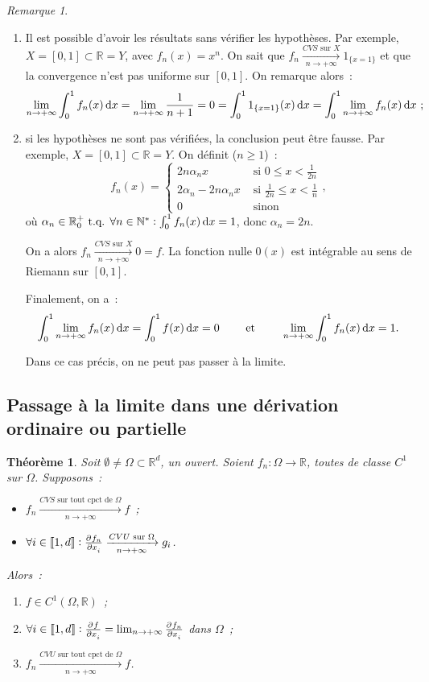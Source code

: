 \documentclass{report}
\newtheorem{thm}{Théorème}[chapter]
\theoremstyle{definition}
\theoremstyle{remark}
\newtheorem*{rmq}{Remarque}
\newcommand{\R}{\mathbb R}
\newcommand{\N}{\mathbb N}
\newcommand{\tq}{\text{ t.q. }}
\newcommand{\CONV}[5]{\xrightarrow[#2 \to #3]{#4 \text{ #5 } #1}}
\newcommand{\CVS}[3]{\CONV{#1}{#2}{#3}{CVS}{sur}}
\newcommand{\CVSc}[3]{\CONV{#1}{#2}{#3}{CVS}{sur tout cpct de}}
\newcommand{\CVU}[3]{\CONV{#1}{#2}{#3}{CVU}{sur}}
\newcommand{\CVUc}[3]{\CONV{#1}{#2}{#3}{CVU}{sur tout cpct de}}
\newcommand{\intint}[2]{\left\llbracket#1, #2\right\rrbracket}
\newcommand{\pinfty}{{+\infty}}
\begin{document}
			\begin{rmq}~
			\begin{enumerate}
				\item Il est possible d'avoir les résultats sans vérifier les hypothèses. Par exemple, $X = [0, 1] \subset \R = Y$, avec $f_n(x) = x^n$.
				      On sait que $f_n \CVS Xn\pinfty 1_{\{x=1\}}$ et que la convergence n'est pas uniforme sur $[0, 1]$. On remarque alors~:
				      \[\lim_{n\to\pinfty}\int_0^1f_n(x)\dif x = \lim_{n\to\pinfty}\frac 1{n+1} = 0 = \int_0^11_{\{x=1\}}(x)\dif x
				      	= \int_0^1\lim_{n\to\pinfty}f_n(x)\dif x~;\]
				\item si les hypothèses ne sont pas vérifiées, la conclusion peut être fausse. Par exemple, $X = [0, 1] \subset \R = Y$. On définit ($n \geq 1$)~:
				      \[f_n(x) = \begin{cases}
				      	2n\alpha_nx &\text{ si } 0 \leq x < \frac 1{2n} \\
				        2\alpha_n - 2n\alpha_nx &\text{ si }\frac 1{2n} \leq x < \frac 1n \\
				        0 &\text{ sinon}\end{cases},\]
				      où $\alpha_n \in \R^+_0 \tq \forall n \in \N^* : \int_0^1f_n(x)\dif x = 1$, donc $\alpha_n = 2n$.

				      On a alors $f_n \CVS Xn\pinfty 0 = f$. La fonction nulle $0(x)$ est intégrable au sens de Riemann sur $[0, 1]$.

				      Finalement, on a~:
				      \[\int_0^1\lim_{n \to \pinfty}f_n(x)\dif x = \int_0^1f(x)\dif x = 0 \qquad \text{ et } \qquad \lim_{n \to \pinfty}\int_0^1f_n(x)\dif x = 1.\]

				      Dans ce cas précis, on ne peut pas passer à la limite.
			\end{enumerate}
			\end{rmq}

		\subsection{Passage à la limite dans une dérivation ordinaire ou partielle}
			\begin{thm} Soit $\emptyset \neq \Omega \subset \R^d$, un ouvert. Soient $f_n : \Omega \to \R$, toutes de classe $C^1$ sur $\Omega$. Supposons~:
			\begin{itemize}
				\item $f_n \CVSc \Omega n\pinfty f$~;
				\item $\forall i \in \intint 1d : \pd {f_n}{x_i} \CVU \Omega n\pinfty g_i$.
			\end{itemize}

			Alors~:
			\begin{enumerate}
				\item $f \in C^1(\Omega, \R)$~;
				\item $\forall i \in \intint 1d : \pd f{x_i} = \lim_{n \to \pinfty} \pd {f_n}{x_i}$ dans $\Omega$~;
				\item $f_n \CVUc \Omega n\pinfty f$.
			\end{enumerate}
			\end{thm}
\end{document}
